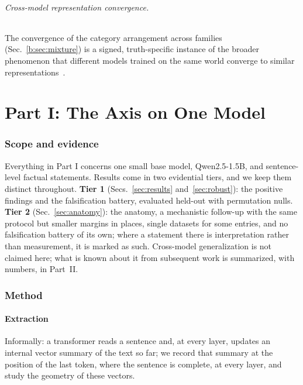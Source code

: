\documentclass[11pt]{article}
\begin{document}
\paragraph{Cross-model representation convergence.} The convergence of the
category arrangement across families (Sec.~\ref{b:sec:mixture}) is a signed,
truth-specific instance of the broader phenomenon that different models
trained on the same world converge to similar
representations~\cite{platonic2024}.


\part*{Part I: The Axis on One Model}
\section{Scope and evidence}
\label{sec:scope}

Everything in Part I concerns one small base model, Qwen2.5-1.5B, and
sentence-level factual statements. Results come in two evidential tiers, and
we keep them distinct throughout. \textbf{Tier 1} (Secs.~\ref{sec:results}
and~\ref{sec:robust}): the positive findings and the falsification battery,
evaluated held-out with permutation nulls. \textbf{Tier 2}
(Sec.~\ref{sec:anatomy}): the anatomy, a mechanistic follow-up with the same
protocol but smaller margins in places, single datasets for some entries, and
no falsification battery of its own; where a statement there is
interpretation rather than measurement, it is marked as such. Cross-model
generalization is not claimed here; what is known about it from subsequent
work is summarized, with numbers, in Part~II.

\section{Method}
\label{sec:method}

\subsection{Extraction}
\label{sec:extraction}

Informally: a transformer reads a sentence and, at every layer, updates an
internal vector summary of the text so far; we record that summary at the
position of the last token, where the sentence is complete, at every layer,
and study the geometry of these vectors.
\end{document}
